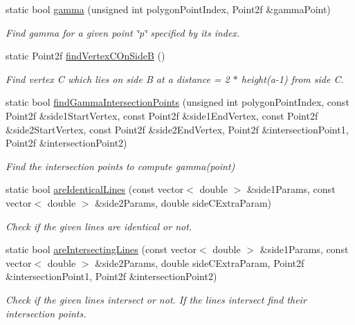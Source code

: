 \begin{DoxyCompactItemize}
static bool \hyperlink{classmultiscale_1_1MinimumAreaEnclosingTriangle_aacc1dc3225d307ff882c6d5564e7831d}{gamma} (unsigned int polygon\-Point\-Index, Point2f \&gamma\-Point)
\begin{DoxyCompactList}\small\item\em Find gamma for a given point \char`\"{}p\char`\"{} specified by its index. \end{DoxyCompactList}\item 
static Point2f \hyperlink{classmultiscale_1_1MinimumAreaEnclosingTriangle_aa0e5813de41cf0415f687d6c6371699c}{find\-Vertex\-C\-On\-Side\-B} ()
\begin{DoxyCompactList}\small\item\em Find vertex C which lies on side B at a distance = 2 $\ast$ height(a-\/1) from side C. \end{DoxyCompactList}\item 
static bool \hyperlink{classmultiscale_1_1MinimumAreaEnclosingTriangle_aa26b3ef84bd96935afa8efab5dfef882}{find\-Gamma\-Intersection\-Points} (unsigned int polygon\-Point\-Index, const Point2f \&side1\-Start\-Vertex, const Point2f \&side1\-End\-Vertex, const Point2f \&side2\-Start\-Vertex, const Point2f \&side2\-End\-Vertex, Point2f \&intersection\-Point1, Point2f \&intersection\-Point2)
\begin{DoxyCompactList}\small\item\em Find the intersection points to compute gamma(point) \end{DoxyCompactList}\item 
static bool \hyperlink{classmultiscale_1_1MinimumAreaEnclosingTriangle_a9c19ca85851ea59de09d7d7be5ba4451}{are\-Identical\-Lines} (const vector$<$ double $>$ \&side1\-Params, const vector$<$ double $>$ \&side2\-Params, double side\-C\-Extra\-Param)
\begin{DoxyCompactList}\small\item\em Check if the given lines are identical or not. \end{DoxyCompactList}\item 
static bool \hyperlink{classmultiscale_1_1MinimumAreaEnclosingTriangle_ae347bd4652c2cc09677ffa4aa509729d}{are\-Intersecting\-Lines} (const vector$<$ double $>$ \&side1\-Params, const vector$<$ double $>$ \&side2\-Params, double side\-C\-Extra\-Param, Point2f \&intersection\-Point1, Point2f \&intersection\-Point2)
\begin{DoxyCompactList}\small\item\em Check if the given lines intersect or not. If the lines intersect find their intersection points. \end{DoxyCompactList}\item 

\end{DoxyCompactItemize}
